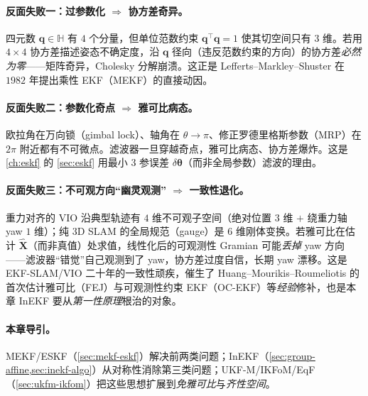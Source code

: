 \paragraph{反面失败一：过参数化 $\Rightarrow$ 协方差奇异。}
四元数 $\mathbf{q}\in\mathbb{H}$ 有 $4$ 个分量，但单位范数约束 $\mathbf{q}^\top\mathbf{q}=1$ 使其切空间只有 $3$ 维。若用 $4\times4$ 协方差描述姿态不确定度，沿 $\mathbf{q}$ 径向（违反范数约束的方向）的协方差\emph{必然为零}——矩阵奇异，Cholesky 分解崩溃。这正是 Lefferts--Markley--Shuster 在 $1982$ 年提出乘性 EKF（MEKF）的直接动因\cite{lefferts1982kalman}。

\paragraph{反面失败二：参数化奇点 $\Rightarrow$ 雅可比病态。}
欧拉角在万向锁（gimbal lock）、轴角在 $\theta\to\pi$、修正罗德里格斯参数（MRP）在 $2\pi$ 附近都有不可微点。滤波器一旦穿越奇点，雅可比病态、协方差爆炸。这是 \cref{ch:eskf} 的 \cref{sec:eskf} 用最小 $3$ 参误差 $\delta\boldsymbol{\theta}$（而非全局参数）滤波的理由。

\paragraph{反面失败三：不可观方向“幽灵观测” $\Rightarrow$ 一致性退化。}
重力对齐的 VIO 沿典型轨迹有 $4$ 维不可观子空间（绝对位置 $3$ 维 $+$ 绕重力轴 yaw $1$ 维）；纯 $3$D SLAM 的全局规范（gauge）是 $6$ 维刚体变换。若雅可比在估计 $\hat{\mathbf{X}}$（而非真值）处求值，线性化后的可观测性 Gramian 可能\emph{丢掉} yaw 方向——滤波器“错觉”自己观测到了 yaw，协方差过度自信，长期 yaw 漂移\cite{sola2017quaternion}。这是 EKF-SLAM/VIO 二十年的一致性顽疾，催生了 Huang--Mourikis--Roumeliotis 的首次估计雅可比（FEJ）与可观测性约束 EKF（OC-EKF）等\emph{经验}修补，也是本章 InEKF 要从\emph{第一性原理}根治的对象。

\paragraph{本章导引。}
MEKF/ESKF（\cref{sec:mekf-eskf}）解决前两类问题；InEKF（\cref{sec:group-affine,sec:inekf-algo}）从对称性消除第三类问题；UKF-M/IKFoM/EqF（\cref{sec:ukfm-ikfom}）把这些思想扩展到\emph{免雅可比}与\emph{齐性空间}。

